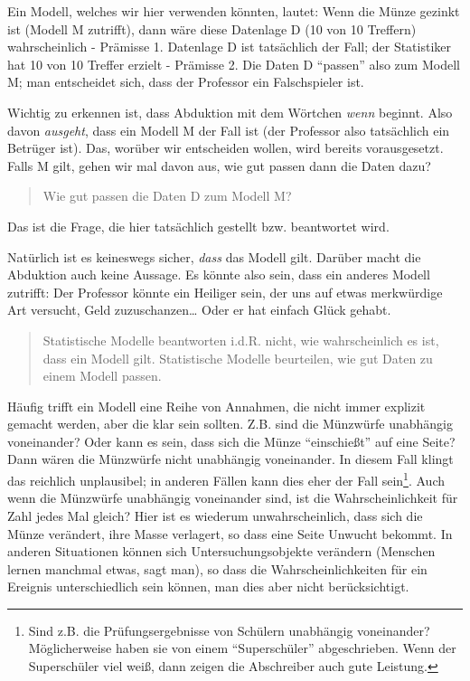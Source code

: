 \documentclass[12pt,ngerman,]{book}
\let\rmarkdownfootnote\footnote%
\def\footnote{\protect\rmarkdownfootnote}
\theoremstyle{definition}
\theoremstyle{definition}
\theoremstyle{remark}
\begin{document}
Ein Modell, welches wir hier verwenden könnten, lautet: Wenn die Münze
gezinkt ist (Modell M zutrifft), dann wäre diese Datenlage D (10 von 10
Treffern) wahrscheinlich - Prämisse 1. Datenlage D ist tatsächlich der
Fall; der Statistiker hat 10 von 10 Treffer erzielt - Prämisse 2. Die
Daten D ``passen'' also zum Modell M; man entscheidet sich, dass der
Professor ein Falschspieler ist.

Wichtig zu erkennen ist, dass Abduktion mit dem Wörtchen \emph{wenn}
beginnt. Also davon \emph{ausgeht}, dass ein Modell M der Fall ist (der
Professor also tatsächlich ein Betrüger ist). Das, worüber wir
entscheiden wollen, wird bereits vorausgesetzt. Falls M gilt, gehen wir
mal davon aus, wie gut passen dann die Daten dazu?

\begin{quote}
Wie gut passen die Daten D zum Modell M?
\end{quote}

Das ist die Frage, die hier tatsächlich gestellt bzw. beantwortet wird.

Natürlich ist es keineswegs sicher, \emph{dass} das Modell gilt. Darüber
macht die Abduktion auch keine Aussage. Es könnte also sein, dass ein
anderes Modell zutrifft: Der Professor könnte ein Heiliger sein, der uns
auf etwas merkwürdige Art versucht, Geld zuzuschanzen\ldots{} Oder er
hat einfach Glück gehabt.

\begin{quote}
Statistische Modelle beantworten i.d.R. nicht, wie wahrscheinlich es
ist, dass ein Modell gilt. Statistische Modelle beurteilen, wie gut
Daten zu einem Modell passen.
\end{quote}

Häufig trifft ein Modell eine Reihe von Annahmen, die nicht immer
explizit gemacht werden, aber die klar sein sollten. Z.B. sind die
Münzwürfe unabhängig voneinander? Oder kann es sein, dass sich die Münze
``einschießt'' auf eine Seite? Dann wären die Münzwürfe nicht unabhängig
voneinander. In diesem Fall klingt das reichlich unplausibel; in anderen
Fällen kann dies eher der Fall sein\footnote{Sind z.B. die
  Prüfungsergebnisse von Schülern unabhängig voneinander? Möglicherweise
  haben sie von einem ``Superschüler'' abgeschrieben. Wenn der
  Superschüler viel weiß, dann zeigen die Abschreiber auch gute
  Leistung.}. Auch wenn die Münzwürfe unabhängig voneinander sind, ist
die Wahrscheinlichkeit für Zahl jedes Mal gleich? Hier ist es wiederum
unwahrscheinlich, dass sich die Münze verändert, ihre Masse verlagert,
so dass eine Seite Unwucht bekommt. In anderen Situationen können sich
Untersuchungsobjekte verändern (Menschen lernen manchmal etwas, sagt
man), so dass die Wahrscheinlichkeiten für ein Ereignis unterschiedlich
sein können, man dies aber nicht berücksichtigt.
\end{document}
